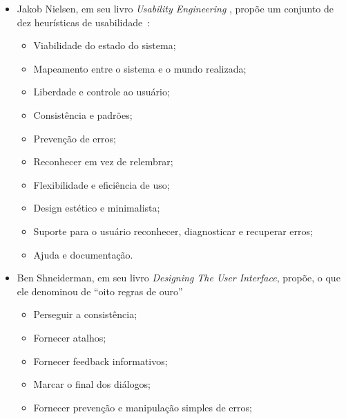 \begin{itemize}
\item Jakob Nielsen, em seu livro \textit{Usability Engineering} , propõe um
conjunto de dez heurísticas de usabilidade~\cite{nielsen1994}:

    \begin{itemize} 

    \item Viabilidade do estado do sistema;

    \item Mapeamento entre o sistema e o mundo realizada;

    \item Liberdade e controle ao usuário;

    \item Consistência e padrões;

    \item Prevenção de erros;

    \item Reconhecer em vez de relembrar;

    \item Flexibilidade e eficiência de uso;

    \item Design estético e minimalista;

    \item Suporte para o usuário reconhecer, diagnosticar e recuperar erros;

    \item Ajuda e documentação.

    \end{itemize}

\item Ben Shneiderman, em seu livro \textit{Designing The User Interface},
propõe, o que ele denominou de ``oito regras de ouro''~\cite{shneiderman2003}

    \begin{itemize} 

    \item Perseguir a consistência;

    \item Fornecer atalhos;

    \item Fornecer feedback informativos;

    \item Marcar o final dos diálogos;

    \item Fornecer prevenção e manipulação simples de erros;


\end{itemize}
\end{itemize}
